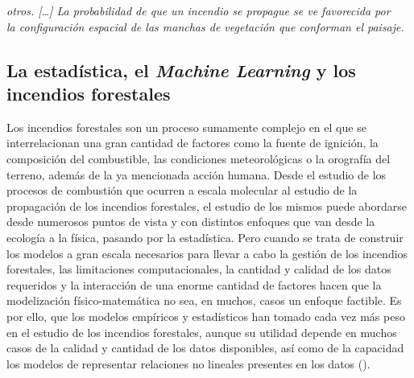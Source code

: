 \documentclass[12pt,a4paper,]{book}
\numberwithin{dummy}{section}
\theoremstyle{ocrenumbox}
\theoremstyle{blacknumex}
\theoremstyle{blacknumbox}
\theoremstyle{ocrenum}
\theoremstyle{ocrenum}
\begin{document}
\hspace*{0.333em}\hspace*{0.333em}\hspace*{0.333em}\hspace*{0.333em}\hspace*{0.333em}\hspace*{0.333em}\emph{otros.
{[}\ldots{]} La probabilidad de que un incendio se propague se ve
favorecida por }\\
\hspace*{0.333em}\hspace*{0.333em}\hspace*{0.333em}\hspace*{0.333em}\hspace*{0.333em}\hspace*{0.333em}\emph{la
configuración espacial de las manchas de vegetación que conforman el
paisaje.}

\hypertarget{la-estaduxedstica-el-machine-learning-y-los-incendios-forestales}{%
\subsection*{\texorpdfstring{La estadística, el \emph{Machine Learning}
y los incendios
forestales}{La estadística, el Machine Learning y los incendios forestales}}\label{la-estaduxedstica-el-machine-learning-y-los-incendios-forestales}}

Los incendios forestales son un proceso sumamente complejo en el que se
interrelacionan una gran cantidad de factores como la fuente de
ignición, la composición del combustible, las condiciones meteorológicas
o la orografía del terreno, además de la ya mencionada acción humana.
Desde el estudio de los procesos de combustión que ocurren a escala
molecular al estudio de la propagación de los incendios forestales, el
estudio de los mismos puede abordarse desde numerosos puntos de vista y
con distintos enfoques que van desde la ecología a la física, pasando
por la estadística. Pero cuando se trata de construir los modelos a gran
escala necesarios para llevar a cabo la gestión de los incendios
forestales, las limitaciones computacionales, la cantidad y calidad de
los datos requeridos y la interacción de una enorme cantidad de factores
hacen que la modelización físico-matemática no sea, en muchos, casos un
enfoque factible. Es por ello, que los modelos empíricos y estadísticos
han tomado cada vez más peso en el estudio de los incendios forestales,
aunque su utilidad depende en muchos casos de la calidad y cantidad de
los datos disponibles, así como de la capacidad los modelos de
representar relaciones no lineales presentes en los datos
(\citet{ReviewMLApplicationsWF}).
\end{document}

